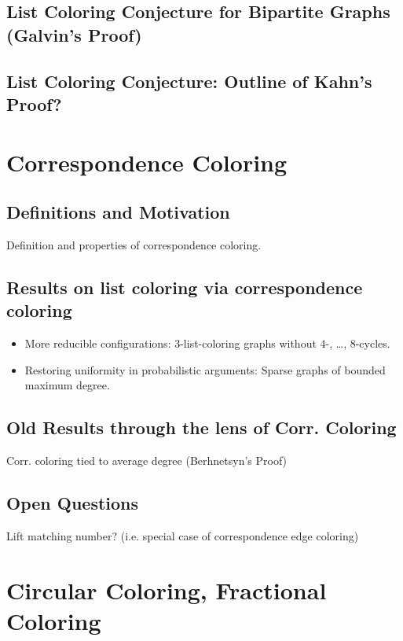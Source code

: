 \documentclass[12pt,twoside,openright,a4paper]{book}
\begin{document}
\section{List Coloring Conjecture for Bipartite Graphs (Galvin's Proof)}
\section{List Coloring Conjecture: Outline of Kahn's Proof?}

\chapter{Correspondence Coloring}\label{chap:corresp}


\section{Definitions and Motivation}

Definition and properties of correspondence coloring.

\section{Results on list coloring via correspondence coloring}

\begin{itemize}
\item More reducible configurations: $3$-list-coloring graphs without $4$-, \ldots, $8$-cycles.
\item Restoring uniformity in probabilistic arguments: Sparse graphs of bounded maximum degree.
\end{itemize}

\section{Old Results through the lens of Corr. Coloring}

Corr. coloring tied to average degree (Berhnetsyn's Proof)

\section{Open Questions}

Lift matching number? (i.e. special case of correspondence edge coloring)

\chapter{Circular Coloring, Fractional Coloring}
\end{document}
